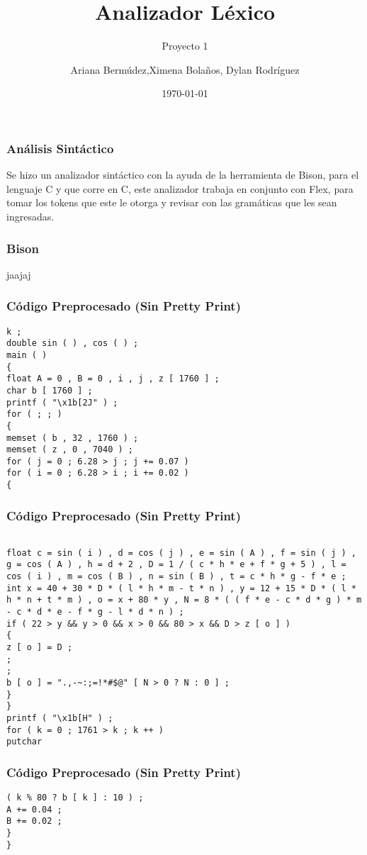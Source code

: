 \documentclass{beamer}
\title{Analizador L\'exico}
\subtitle{Proyecto 1}
\author{Ariana Berm\'udez,Ximena Bola\~nos, Dylan Rodr\'iguez}
\institute{Instituto Tecnol\'ogico de Costa Rica}
\date{\today}
\begin{document}
\begin{frame}
 \titlepage 
 \end{frame}\begin{frame}
 \frametitle{An\'alisis Sint\'actico}
  Se hizo un analizador sint\'actico con la ayuda de la herramienta de Bison, para el lenguaje C y que corre en C, este analizador trabaja en conjunto con Flex, para tomar los tokens que este le otorga y revisar con las gram\'aticas que les sean ingresadas.\end{frame}\begin{frame}
 \frametitle{Bison}
 jaajaj\end{frame}\begin{frame}[fragile]
\frametitle{C\'odigo Preprocesado (Sin Pretty Print)}
\begin{lstlisting}[style=CStyle]
k ; 
double sin ( ) , cos ( ) ; 
main ( ) 
{ 
float A = 0 , B = 0 , i , j , z [ 1760 ] ; 
char b [ 1760 ] ; 
printf ( "\x1b[2J" ) ; 
for ( ; ; ) 
{ 
memset ( b , 32 , 1760 ) ; 
memset ( z , 0 , 7040 ) ; 
for ( j = 0 ; 6.28 > j ; j += 0.07 ) 
for ( i = 0 ; 6.28 > i ; i += 0.02 ) 
{ \end{lstlisting}
\end{frame}
\begin{frame}[fragile]
\frametitle{C\'odigo Preprocesado (Sin Pretty Print)}
\begin{lstlisting}[style=CStyle]

float c = sin ( i ) , d = cos ( j ) , e = sin ( A ) , f = sin ( j ) , g = cos ( A ) , h = d + 2 , D = 1 / ( c * h * e + f * g + 5 ) , l = cos ( i ) , m = cos ( B ) , n = sin ( B ) , t = c * h * g - f * e ; 
int x = 40 + 30 * D * ( l * h * m - t * n ) , y = 12 + 15 * D * ( l * h * n + t * m ) , o = x + 80 * y , N = 8 * ( ( f * e - c * d * g ) * m - c * d * e - f * g - l * d * n ) ; 
if ( 22 > y && y > 0 && x > 0 && 80 > x && D > z [ o ] ) 
{ 
z [ o ] = D ; 
; 
; 
b [ o ] = ".,-~:;=!*#$@" [ N > 0 ? N : 0 ] ; 
} 
} 
printf ( "\x1b[H" ) ; 
for ( k = 0 ; 1761 > k ; k ++ ) 
putchar \end{lstlisting}
\end{frame}
\begin{frame}[fragile]
\frametitle{C\'odigo Preprocesado (Sin Pretty Print)}
\begin{lstlisting}[style=CStyle]
( k % 80 ? b [ k ] : 10 ) ; 
A += 0.04 ; 
B += 0.02 ; 
} 
} \end{lstlisting}
\end{frame}
\end{document}
